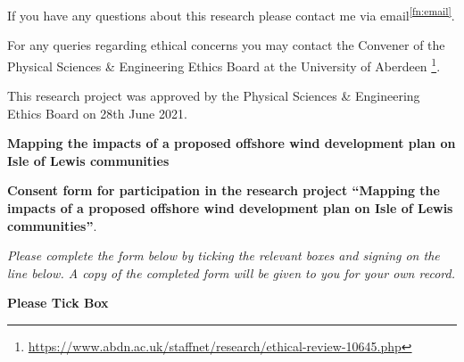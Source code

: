 {If you have any questions about this research please contact me via
email\textsuperscript{\ref{fn:email}}.

For any queries regarding ethical concerns you may contact the Convener of the
Physical Sciences \& Engineering Ethics Board at the University of Aberdeen%
\footnote{\url{https://www.abdn.ac.uk/staffnet/research/ethical-review-10645.php}}.

\vspace{20pt}
This research project was approved by the Physical Sciences \& Engineering
Ethics Board on 28th June 2021.

\newpage

\begin{center}
\Large
\textbf{Mapping the impacts of a proposed offshore wind development plan on
Isle of Lewis communities}
\end{center}

\vspace{24pt}
\textbf{Consent form for participation in the research project ``Mapping the
impacts of a proposed offshore wind development plan on Isle of Lewis
communities''}.

\textit{Please complete the form below by ticking the relevant boxes and
signing on the line below. A copy of the completed form will be given to you
for your own record.}

\vspace{24pt}
\textbf{Please Tick Box}

}
